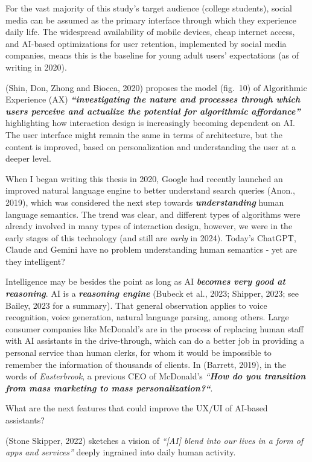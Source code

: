 \documentclass[
  letterpaper,
  DIV=11,
  numbers=noendperiod]{scrartcl}
\begin{document}
For the vast majority of this study's target audience (college
students), social media can be assumed as the primary interface through
which they experience daily life. The widespread availability of mobile
devices, cheap internet access, and AI-based optimizations for user
retention, implemented by social media companies, means this is the
baseline for young adult users' expectations (as of writing in 2020).

(Shin, Don, Zhong and Biocca, 2020) proposes the model (fig.~10) of
Algorithmic Experience (AX) \textbf{\emph{``investigating the nature and
processes through which users perceive and actualize the potential for
algorithmic affordance''}} highlighting how interaction design is
increasingly becoming dependent on AI. The user interface might remain
the same in terms of architecture, but the content is improved, based on
personalization and understanding the user at a deeper level.

When I began writing this thesis in 2020, Google had recently launched
an improved natural language engine to better understand search queries
(Anon., 2019), which was considered the next step towards
\textbf{\emph{understanding}} human language semantics. The trend was
clear, and different types of algorithms were already involved in many
types of interaction design, however, we were in the early stages of
this technology (and still are \emph{early} in 2024). Today's ChatGPT,
Claude and Gemini have no problem understanding human semantics - yet
are they intelligent?

Intelligence may be besides the point as long as AI
\textbf{\emph{becomes very good at reasoning}}. AI is a
\textbf{\emph{reasoning engine}} (Bubeck et al., 2023; Shipper, 2023;
see Bailey, 2023 for a summary). That general observation applies to
voice recognition, voice generation, natural language parsing, among
others. Large consumer companies like McDonald's are in the process of
replacing human staff with AI assistants in the drive-through, which can
do a better job in providing a personal service than human clerks, for
whom it would be impossible to remember the information of thousands of
clients. In (Barrett, 2019), in the words of \emph{Easterbrook}, a
previous CEO of McDonald's \emph{``\textbf{How do you transition from
mass marketing to mass personalization?{}``}}.

What are the next features that could improve the UX/UI of AI-based
assistants?

(Stone Skipper, 2022) sketches a vision of \emph{``{[}AI{]} blend into
our lives in a form of apps and services''} deeply ingrained into daily
human activity.
\end{document}

